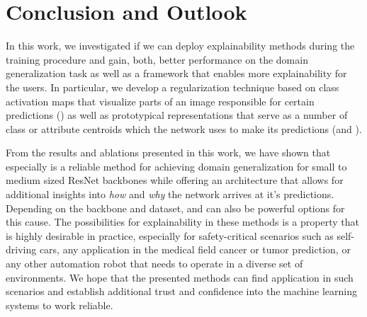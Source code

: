 \chapter{Conclusion and Outlook}

In this work, we investigated if we can deploy explainability methods during the training procedure and gain, both, better performance on the domain generalization task as well as a framework that enables more explainability for the users. In particular, we develop a regularization technique based on class activation maps that visualize parts of an image responsible for certain predictions (\divcam) as well as prototypical representations that serve as a number of class or attribute centroids which the network uses to make its predictions (\prodrop and \dtransformers).

From the results and ablations presented in this work, we have shown that especially \divcam is a reliable method for achieving domain generalization for small to medium sized ResNet backbones while offering an architecture that allows for additional insights into \emph{how} and \emph{why} the network arrives at it's predictions. Depending on the backbone and dataset, \prodrop and \dtransformers can also be powerful options for this cause. The possibilities for explainability in these methods is a property that is highly desirable in practice, especially for safety-critical scenarios such as self-driving cars, any application in the medical field \eg cancer or tumor prediction, or any other automation robot that needs to operate in a diverse set of environments. We hope that the presented methods can find application in such scenarios and establish additional trust and confidence into the machine learning systems to work reliable.

